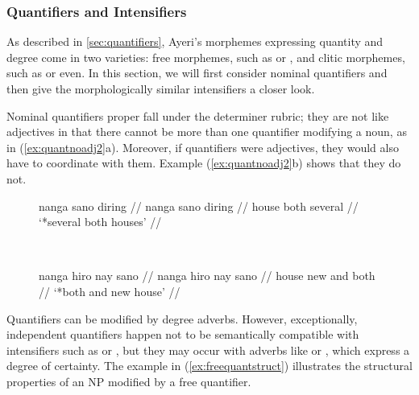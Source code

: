 
\subsubsection{Quantifiers and Intensifiers}
\label{subsubsec:quantsyn}

As described in \autoref{sec:quantifiers}, Ayeri's morphemes expressing
quantity and degree come in two varieties: free morphemes, such as
 or , and clitic
morphemes, such as  or 
{even}. In this section, we will first consider nominal quantifiers and then
give the morphologically similar intensifiers a closer look.

Nominal quantifiers proper fall under the determiner rubric; they are not like
adjectives in that there cannot be more than one quantifier modifying a noun, as
in (\ref{ex:quantnoadj2}a). Moreover, if quantifiers were adjectives, they would
also have to coordinate with them. Example
(\ref{ex:quantnoadj2}b) shows that they do not.

\begin{figure}[h]
\ex{}\label{ex:quantnoadj2}
\begin{minipage}[t]{.5\remaining}
\tl\quad\label{ex:quantnoadj2_2}\ljudge*\begingl
	\gla nanga sano diring //
	\glb nanga sano diring //
	\glc house both several //
	\glft `*several both houses' //
\endgl
\end{minipage}
~
\begin{minipage}[t]{.5\remaining}
\tl\quad\label{ex:quantnoadj2_3}\ljudge*\begingl
	\gla nanga hiro nay sano //
	\glb nanga hiro nay sano //
	\glc house new and both //
	\glft `*both and new house' //
\endgl
\end{minipage}
\xe
\end{figure}

Quantifiers can be modified by degree adverbs. However, exceptionally,
independent quantifiers happen not to be semantically compatible with
intensifiers such as  or
, but they may occur with adverbs like
 or , which express a
degree of certainty. The example in (\ref{ex:freequantstruct}) illustrates the
structural properties of an NP modified by a free quantifier.


